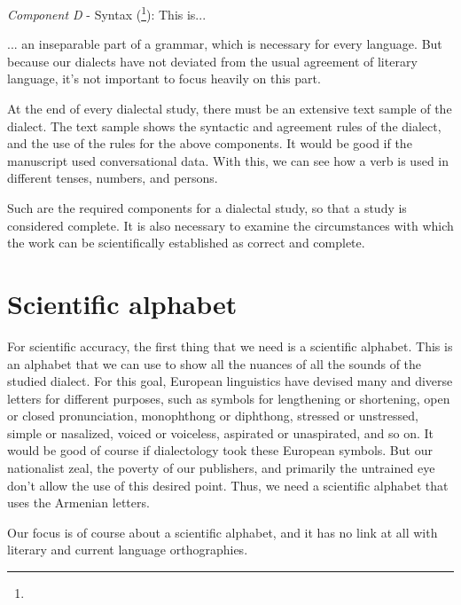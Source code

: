 \textit{Component D} - Syntax (\footnote{}): This is... 

\begin{adjarianpage}\label{page:6}\end{adjarianpage}%


... an inseparable part of a grammar, which is necessary for every language. But because our dialects have not deviated from the usual agreement of literary language, it's not important to focus heavily on this part. 

At the end of every dialectal study, there must be an extensive text sample of the dialect. The text sample shows the syntactic and agreement rules of the dialect, and the use of the rules for the above components. It would be good if the manuscript used conversational data. With this, we can see how a verb is used in different tenses, numbers, and persons. 

Such are the required components for a dialectal study, so that a study is considered complete. It is also necessary to examine the circumstances with which the work can be scientifically established as correct and complete. 

\section{Scientific alphabet}\label{sec:IntroAdjarian:scientificAlphabet}

For scientific accuracy, the first thing that we need is a scientific alphabet. This is an alphabet that we can use to show all the nuances of all the sounds of the studied dialect. For this goal, European linguistics have devised many and diverse letters for different purposes, such as symbols for lengthening or shortening, open or closed pronunciation, monophthong or diphthong, stressed or unstressed, simple or nasalized, voiced or voiceless, aspirated or unaspirated, and so on. It would be good of course if dialectology took these European symbols. But our nationalist zeal, the poverty of our publishers, and primarily the untrained eye don't allow the use of this desired point. Thus, we need a scientific alphabet that uses the Armenian letters.

Our focus is of course about a scientific alphabet, and it has no link at all with literary and current language orthographies. 

